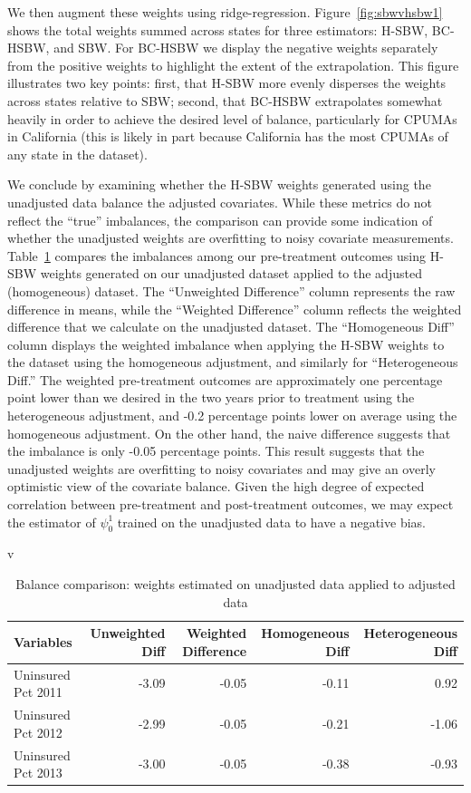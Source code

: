 \documentclass[aoas]{imsart}
\theoremstyle{plain}
\theoremstyle{remark}
\begin{document}
We then augment these weights using ridge-regression. Figure~\ref{fig:sbwvhsbw1} shows the total weights summed across states for three estimators: H-SBW, BC-HSBW, and SBW. For BC-HSBW we display the negative weights separately from the positive weights to highlight the extent of the extrapolation. This figure illustrates two key points: first, that H-SBW more evenly disperses the weights across states relative to SBW; second, that BC-HSBW extrapolates somewhat heavily in order to achieve the desired level of balance, particularly for CPUMAs in California (this is likely in part because California has the most CPUMAs of any state in the dataset).

We conclude by examining whether the H-SBW weights generated using the unadjusted data balance the adjusted covariates. While these metrics do not reflect the ``true'' imbalances, the comparison can provide some indication of whether the unadjusted weights are overfitting to noisy covariate measurements. Table~\ref{tab:balcomp} compares the imbalances among our pre-treatment outcomes using H-SBW weights generated on our unadjusted dataset applied to the adjusted (homogeneous) dataset. The ``Unweighted Difference'' column represents the raw difference in means, while the ``Weighted Difference'' column reflects the weighted difference that we calculate on the unadjusted dataset. The ``Homogeneous Diff'' column displays the weighted imbalance when applying the H-SBW weights to the dataset using the homogeneous adjustment, and similarly for ``Heterogeneous Diff.'' The weighted pre-treatment outcomes are approximately one percentage point lower than we desired in the two years prior to treatment using the heterogeneous adjustment, and -0.2 percentage points lower on average using the homogeneous adjustment. On the other hand, the naive difference suggests that the imbalance is only -0.05 percentage points. This result suggests that the unadjusted weights are overfitting to noisy covariates and may give an overly optimistic view of the covariate balance. Given the high degree of expected correlation between pre-treatment and post-treatment outcomes, we may expect the estimator of $\psi^1_0$ trained on the unadjusted data to have a negative bias.

v
\begin{table}[ht]
\caption{Balance comparison: weights estimated on unadjusted data applied to adjusted data}\label{tab:balcomp}
\begin{tabular}{lrrrr}
  \hline
Variables & Unweighted Diff & Weighted Difference & Homogeneous Diff & Heterogeneous Diff\\ 
  \hline
Uninsured Pct 2011 & -3.09 & -0.05 & -0.11 & 0.92 \\ 
  Uninsured Pct 2012 & -2.99 & -0.05 & -0.21 & -1.06 \\ 
  Uninsured Pct 2013 & -3.00 & -0.05 & -0.38 & -0.93 \\
   \hline
\end{tabular}
\end{table}
\end{document}

